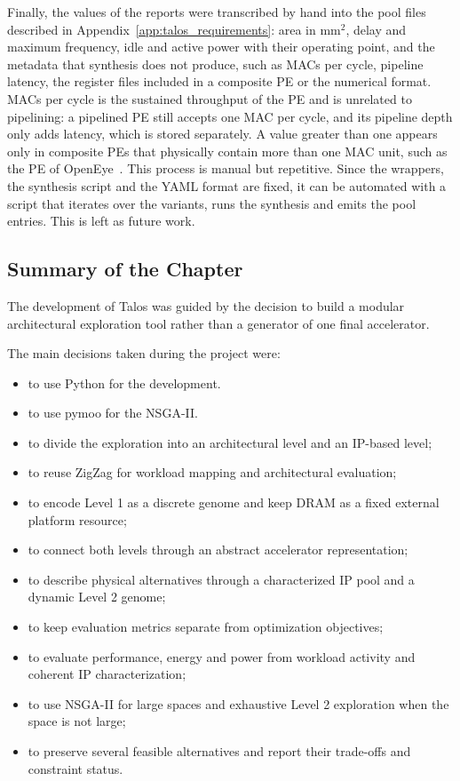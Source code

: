 Finally, the values of the reports were transcribed by hand into the
pool files described in Appendix~\ref{app:talos_requirements}: area in
mm$^2$, delay and maximum frequency, idle and active power with their
operating point, and the metadata that synthesis does not produce,
such as MACs per cycle, pipeline latency, the register files included
in a composite PE or the numerical format. MACs per cycle is the
sustained throughput of the PE and is unrelated to pipelining: a
pipelined PE still accepts one MAC per cycle, and its pipeline depth
only adds latency, which is stored separately. A value greater than
one appears only in composite PEs that physically contain more than
one MAC unit, such as the PE of OpenEye~\cite{openeye_repo}. This process is manual but
repetitive. Since the wrappers, the synthesis script and the YAML
format are fixed, it can be automated with a script that iterates over
the variants, runs the synthesis and emits the pool entries. This is
left as future work.

\subsection{Summary of the Chapter}
The development of Talos was guided by the decision to build a
modular architectural exploration tool rather than a generator of one
final accelerator.

The main decisions taken during the project were:

\begin{itemize}
\item to use Python for the development.
\item to use pymoo for the NSGA-II.
\item to divide the exploration into an architectural level and an
IP-based level;
\item to reuse ZigZag for workload mapping and architectural
evaluation;
\item to encode Level 1 as a discrete genome and keep DRAM as a fixed
external platform resource;
\item to connect both levels through an abstract accelerator
representation;
\item to describe physical alternatives through a characterized IP
pool and a dynamic Level 2 genome;
\item to keep evaluation metrics separate from optimization
objectives;
\item to evaluate performance, energy and power from workload activity and
coherent IP characterization;
\item to use NSGA-II for large spaces and exhaustive Level 2
exploration when the space is not large;
\item to preserve several feasible alternatives and report their
trade-offs and constraint status.
\end{itemize}

